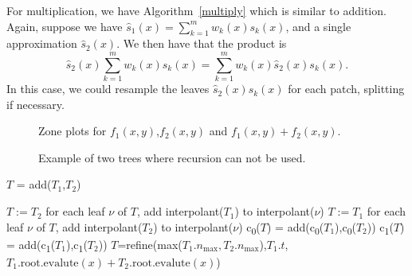 \documentclass{article}
\newcommand{\nmax}{n_{\text{max}}}
\newcommand{\child}[1]{c\textsubscript{#1}}
\begin{document}
For multiplication, we have Algorithm~\ref{multiply} which is similar to addition. Again, suppose we have $\hat{s}_1(x)=\sum_{k=1}^m w_k(x) s_k(x)$, and a single approximation $\hat{s}_2(x)$. We then have that the product is
\begin{equation}
	\hat{s}_2(x) \sum_{k=1}^m w_k(x) s_k(x) = \sum_{k=1}^m w_k(x) \hat{s}_2(x) s_k(x).
\end{equation}
In this case, we could resample the leaves $\hat{s}_2(x) s_k(x)$ for each patch, splitting if necessary.

\begin{figure}[!htb]
\centering
{}
 
 

\caption{Zone plots for $f_1(x,y)$,$f_2(x,y)$ and $f_1(x,y)+f_2(x,y)$.}
\label{zone_tan}
\end{figure}

\begin{figure}[!htb]
\centering
{}


\caption{Example of two trees where recursion can not be used.}
\label{bad_split}
\end{figure}

\begin{algorithm}[!h]
\caption{$T$ = add($T_1$,$T_2$)}
\label{addition}
\begin{algorithmic}
\STATE $T:=T_2$
\STATE for each leaf $\nu$ of $T$, add interpolant($T_1$) to interpolant($\nu$)
\STATE $T:=T_1$
\STATE for each leaf $\nu$ of $T$, add interpolant($T_2$) to interpolant($\nu$)
\STATE \child{0}($T$) = add(\child{0}($T_1$),\child{0}($T_2$))
\STATE \child{1}($T$) = add(\child{1}($T_1$),\child{1}($T_2$))
\ELSE
\STATE $T$=refine(max($T_1.\nmax,T_2.\nmax$),$T_1.t$,$T_1.\text{root.evalute}(x)+T_2.\text{root.evalute}(x)$)
\ENDIF
\end{algorithmic}
\end{algorithm}
\end{document}
